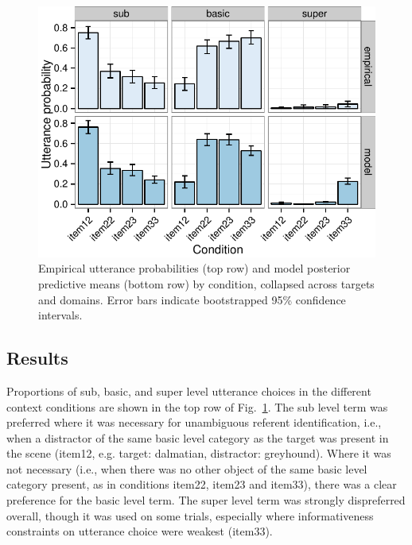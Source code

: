 \documentclass[10pt,letterpaper]{article}
\newcommand{\jd}[1]{\textcolor{Blue}{[jd: #1]}}
\newcommand{\ndg}[1]{\textcolor{Green}{[ndg: #1]}}
\newcommand{\figref}[1]{Fig.~\ref{#1}}
\begin{document}

\begin{figure}[bt!]
\centering
\includegraphics[width=.5\textwidth]{graphs/qualitativepattern}
\caption{Empirical utterance probabilities (top row) and model posterior predictive means (bottom row) by condition, collapsed across targets and domains. Error bars indicate bootstrapped 95\% confidence intervals.}
\label{fig:qualitativemodel}
\end{figure}

\subsection{\bf Results}

Proportions of sub, basic, and super level utterance choices in the different context conditions are shown in the top row of \figref{fig:qualitativemodel}. The sub level term was preferred where it was necessary for unambiguous referent identification, i.e., when a distractor of the same basic level category as the target was present in the scene (item12, e.g. target: dalmatian, distractor: greyhound). Where it was not necessary (i.e., when there was no other object of the same basic level category present, as in conditions item22, item23 and item33), there was a clear preference for the basic level term. The super level term was strongly dispreferred overall, though it was used on some trials, especially where informativeness constraints on utterance choice were weakest (item33). 
%
\end{document}
